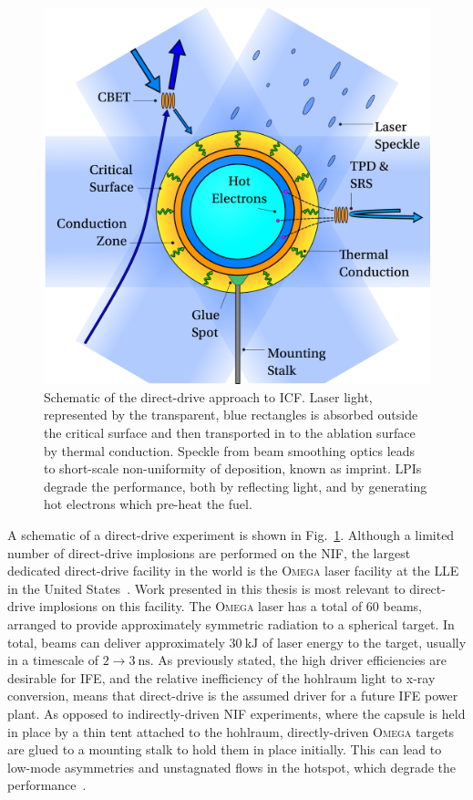 \begin{figure}[t!]
    \includegraphics[width=0.7\linewidth]{Introduction/Images/direct icf white.png}
    \centering
    \caption{Schematic of the direct-drive approach to \ac{ICF}.
    Laser light, represented by the transparent, blue rectangles is absorbed outside the critical surface and then transported in to the ablation surface by thermal conduction.
    Speckle from beam smoothing optics leads to short-scale non-uniformity of deposition, known as imprint.
    \ac{LPIs} degrade the performance, both by reflecting light, and by generating hot electrons which pre-heat the fuel.
    }%
    \label{fig:intro_direct}
\end{figure}

A schematic of a direct-drive experiment is shown in Fig.~\ref{fig:intro_direct}.
Although a limited number of direct-drive implosions are performed on the \ac{NIF}, the largest dedicated direct-drive facility in the world is the \textsc{Omega} laser facility at the \ac{LLE} in the United States~\cite{simon_lle_1989,boehly_upgrade_1995}.
Work presented in this thesis is most relevant to direct-drive implosions on this facility.
The \textsc{Omega} laser has a total of 60 beams, arranged to provide approximately symmetric radiation to a spherical target.
In total, beams can deliver approximately $30\ \text{kJ}$ of laser energy to the target, usually in a timescale of $2\rightarrow3\ \text{ns}$.
As previously stated, the high driver efficiencies are desirable for \ac{IFE}, and the relative inefficiency of the hohlraum light to x-ray conversion, means that direct-drive is the assumed driver for a future \ac{IFE} power plant.
As opposed to indirectly-driven \ac{NIF} experiments, where the capsule is held in place by a thin tent attached to the hohlraum, directly-driven \textsc{Omega} targets are glued to a mounting stalk to hold them in place initially.
This can lead to low-mode asymmetries and unstagnated flows in the hotspot, which degrade the performance~\cite{gatujohnson_impact_2020}.

